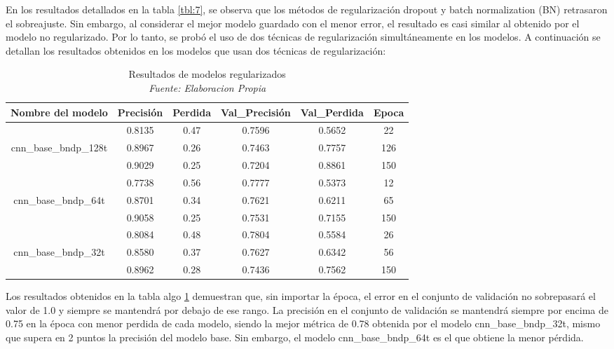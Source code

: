 En los resultados detallados en la tabla \ref{tbl:7}, se observa que los métodos de regularización dropout y batch normalization (BN) retrasaron el sobreajuste. Sin embargo, al considerar el mejor modelo guardado con el menor error, el resultado es casi similar al obtenido por el modelo no regularizado. Por lo tanto, se probó el uso de dos técnicas de regularización simultáneamente en los modelos. A continuación se detallan los resultados obtenidos en los modelos que usan dos técnicas de regularización:

\begin{table}[!ht]
	\centering
	\begin{tabular}{|c|c|c|c|c|c|}
		\hline
		\textbf{Nombre del modelo} & \textbf{Precisión} & \textbf{Perdida} & \textbf{Val\_Precisión} & \textbf{Val\_Perdida} & \textbf{Epoca} \\ \hline
		~ & 0.8135 & 0.47 & 0.7596 & 0.5652 & 22 \\ \cline{2-6}
		cnn\_base\_bndp\_128t & 0.8967 & 0.26 & 0.7463 & 0.7757 & 126 \\ \cline{2-6}
		~ & 0.9029 & 0.25 & 0.7204 & 0.8861 & 150 \\ \hline
		~ & 0.7738 & 0.56 & 0.7777 & 0.5373 & 12 \\ \cline{2-6}
		cnn\_base\_bndp\_64t & 0.8701 & 0.34 & 0.7621 & 0.6211 & 65 \\ \cline{2-6}
		~ & 0.9058 & 0.25 & 0.7531 & 0.7155 & 150 \\ \hline
		~ & 0.8084 & 0.48 & 0.7804 & 0.5584 & 26 \\ \cline{2-6}
		cnn\_base\_bndp\_32t & 0.8580 & 0.37 & 0.7627 & 0.6342 & 56 \\ \cline{2-6}
		~ & 0.8962 & 0.28 & 0.7436 & 0.7562 & 150 \\ \hline
	\end{tabular}
	\caption{Resultados de modelos regularizados
		\\\textit{Fuente: Elaboracion Propia}}
	\label{tbl:8}
\end{table}

Los resultados obtenidos en la tabla algo \ref{tbl:8} demuestran que, sin importar la época, el error en el conjunto de validación no sobrepasará el valor de 1.0 y siempre se mantendrá por debajo de ese rango. La precisión en el conjunto de validación se mantendrá siempre por encima de 0.75 en la época con menor perdida de cada modelo, siendo la mejor métrica de 0.78 obtenida por el modelo cnn\_base\_bndp\_32t, mismo que supera en 2 puntos la precisión del modelo base. Sin embargo, el modelo cnn\_base\_bndp\_64t es el que obtiene la menor pérdida.


